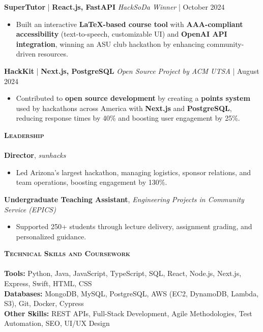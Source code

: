 \documentclass[10pt]{article}
\newcommand{\lineunder} {
    \vspace*{-8pt} \\
    \hspace*{-18pt} \hrulefill \\
}
\newcommand{\header} [1] {
    {\hspace*{-15pt}\vspace*{3pt} \textsc{#1}}
    \vspace*{-2pt} \lineunder
}
\begin{document}
\textbf{SuperTutor} | \textbf{React.js, FastAPI} \hfill \textit{HackSoDa Winner} | October 2024  \\
\vspace{-1mm}
\begin{itemize}[leftmargin=5mm, itemsep=0mm]
  \item Built an interactive \textbf{LaTeX-based course tool} with \textbf{AAA-compliant accessibility} (text-to-speech, customizable UI) and \textbf{OpenAI API integration}, winning an ASU club hackathon by enhancing community-driven resources.  \\
\end{itemize}
\textbf{HackKit} | \textbf{Next.js, PostgreSQL} \hfill \textit{Open Source Project by ACM UTSA} | August 2024  \\
\vspace{-1mm}
\begin{itemize}[leftmargin=5mm, itemsep=0mm]
  \item Contributed to \textbf{open source development} by creating a \textbf{points system} used by hackathons across America with \textbf{Next.js} and \textbf{PostgreSQL}, reducing response times by 40\% and boosting user engagement by 25\%.  \\
\end{itemize}
\header{\textbf{Leadership}}
\vspace{0.5mm}
\textbf{Director}, \textit{sunhacks} \\
\vspace{-1mm}
\begin{itemize}[leftmargin=5mm, itemsep=0mm]
  \item Led Arizona’s largest hackathon, managing logistics, sponsor relations, and team operations, boosting engagement by 130\%.
\end{itemize}
\textbf{Undergraduate Teaching Assistant}, \textit{Engineering Projects in Community Service (EPICS)} \\
\vspace{-1mm}
\begin{itemize}[leftmargin=5mm, itemsep=0mm]
  \item Supported 250+ students through lecture delivery, assignment grading, and personalized guidance.
\end{itemize}

\header{\textbf{Technical Skills and Coursework}}
\vspace{0.5mm}
\textbf{Tools:} Python, Java, JavaScript, TypeScript, SQL, React, Node.js, Next.js, Express, Swift, HTML, CSS \\
\vspace{0.5mm}
\textbf{Databases:} MongoDB, MySQL, PostgreSQL, AWS (EC2, DynamoDB, Lambda, S3), Git, Docker, Cypress \\
\vspace{0.5mm}
\textbf{Other Skills:} REST APIs, Full-Stack Development, Agile Methodologies, Test Automation, SEO, UI/UX Design \\
\vspace{2mm}
\end{document}
